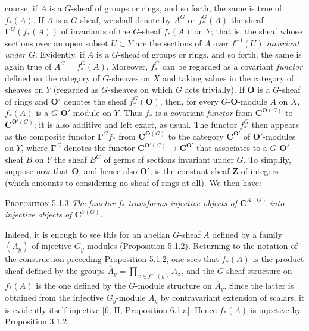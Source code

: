 \clearpage
{}

course, if $A$ is a $G$-sheaf of groups or rings, and so forth, the same is
true of $f_*(A)$.
If $A$ is a $G$-sheaf, we shall denote by $A^G$ or $f_*^G(A)$ the sheaf
$\mathbf{\Gamma}^G(f_*(A))$ of invariants of the $G$-sheaf $f_*(A)$ on $Y$; that is,
the sheaf whose sections over an open subset $U\subset Y$ are the sections of
$A$ over $f^{-1}(U)$ \textit{invariant under $G$}. Evidently, if $A$ is a $G$-sheaf of
groups or rings, and so forth, the same is again true of $A^G=f_*^G(A)$.
Moreover, $f_*^G$ can be regarded as a covariant \textit{functor} defined on
the category of $G$-sheaves on $X$ and taking values in the category of
sheaves on $Y$ (regarded as $G$-sheaves on which $G$ acts trivially). If ${\mathbf O}$
is a $G$-sheaf of rings and ${\mathbf O}'$ denotes the sheaf $f_*^G({\mathbf O})$, then, for every
$G$-${\mathbf O}$-module $A$ on $X$, $f_*(A)$ is a $G$-${\mathbf O}'$-module on $Y$. Thus $f_*$
is a covariant \textit{functor} from ${\mathbf C}^{{\mathbf O}(G)}$ to ${\mathbf C}^{{\mathbf O}'(G)}$; it is also
additive and left exact, as usual. The functor $f_*^G$ then appears as the
composite functor $\mathbf{\Gamma}^Gf_*$ from ${\mathbf C}^{{\mathbf O}(G)}$ to the category ${\mathbf C}^{{\mathbf O}'}$ of
${\mathbf O}'$-modules on $Y$, where $\mathbf{\Gamma}^G$ denotes the functor
${\mathbf C}^{{\mathbf O}'(G)}\to {\mathbf C}^{{\mathbf O}'}$ that associates to a $G$-${\mathbf O}'$-sheaf $B$ on
$Y$ the sheaf $B^G$ of germs of sections invariant under $G$. To simplify,
suppose now that ${\mathbf O}$, and hence also ${\mathbf O}'$, is the constant sheaf $\mathbf Z$
of integers (which amounts to considering no sheaf of rings at all). We then
have:

\textsc{Proposition 5.1.3} \textit{The functor $f_*$ transforms
injective objects of ${\mathbf C}^{X(G)}$ into injective objects of ${\mathbf C}^{Y(G)}$.}

Indeed, it is enough to see this for an abelian $G$-sheaf $A$ defined by a
family $(A_y)$ of injective $G_y$-modules (Proposition 5.1.2). Returning to the
notation of the construction preceding Proposition 5.1.2, one sees that
$f_*(A)$ is the product sheaf defined by the groups $\overline A_y=\displaystyle\prod_{x\in f^{-1}(y)}A_x$,
and the $G$-sheaf structure on $f_*(A)$ is the one defined by the $G$-module
structure on $\overline A_y$. Since the latter is obtained from the injective
$G_y$-module $A_y$ by contravariant extension of scalars, it is evidently
itself injective [6, II, Proposition 6.1.a]. Hence $f_*(A)$ is injective by
Proposition 3.1.2.

